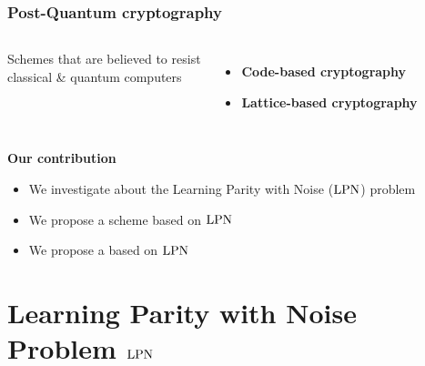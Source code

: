 \begin{frame}
\frametitle{Post-Quantum cryptography}
\begin{columns}[c]
Schemes that are believed to resist \\
classical \& quantum computers
      \begin{itemize}
      \item \textbf{Code-based cryptography}
      \item \alert<2->{\textbf{Lattice-based cryptography}}
      \end{itemize} 
\end{columns}

 \vspace{10pt}
 \begin{block}{\textbf{Our contribution}}
 \begin{itemize}
  \item<2-> We investigate about the \alert{Learning Parity with Noise} ($\mathrm{LPN}$) problem
  \item<3-> We propose a {\color{blue}{Threshold Public-Key Encryption}} scheme based on $\mathrm{LPN}$
  \item<4-> We propose a {\color{blue}{Commitment protocol}} based on $\mathrm{LPN}$
 \end{itemize}

\end{block}

\end{frame}


\section{Learning Parity with Noise Problem $\mathrm{LPN}$}

